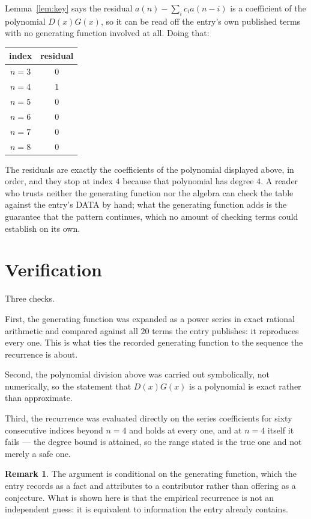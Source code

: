 \documentclass[11pt,a4paper]{article}
\theoremstyle{plain}
\theoremstyle{definition}
\newtheorem{remark}[theorem]{Remark}
\begin{document}
Lemma~\ref{lem:key} says the residual $a(n)-\sum_ic_ia(n-i)$ is a coefficient of the
polynomial $D(x)G(x)$, so it can be read off the entry's own published terms with no
generating function involved at all. Doing that:
\begin{center}
\begin{tabular}{cc}
index & residual \\ \hline
$n=3$ & $0$ \\
$n=4$ & $1$ \\
$n=5$ & $0$ \\
$n=6$ & $0$ \\
$n=7$ & $0$ \\
$n=8$ & $0$
\end{tabular}
\end{center}
The residuals are exactly the coefficients of the polynomial displayed above, in order, and
they stop at index $4$ because that polynomial has degree $4$. A reader who trusts
neither the generating function nor the algebra can check the table against the entry's DATA
by hand; what the generating function adds is the guarantee that the pattern continues, which
no amount of checking terms could establish on its own.

\section{Verification}

Three checks.

First, the generating function was expanded as a power series in exact rational arithmetic and
compared against all $20$ terms the entry publishes: it reproduces every one. This is
what ties the recorded generating function to the sequence the recurrence is about.

Second, the polynomial division above was carried out symbolically, not numerically, so the
statement that $D(x)G(x)$ is a polynomial is exact rather than approximate.

Third, the recurrence was evaluated directly on the series coefficients for sixty consecutive
indices beyond $n=4$ and holds at every one, and at $n=4$ itself it fails --- the
degree bound is attained, so the range stated is the true one and not merely a safe one.

\begin{remark}
The argument is conditional on the generating function, which the entry records as a fact and
attributes to a contributor rather than offering as a conjecture. What is shown here is that
the empirical recurrence is not an independent guess: it is equivalent to information the
entry already contains.
\end{remark}
\end{document}
